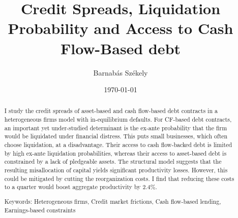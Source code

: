 \documentclass[12pt]{article}
\title{Credit Spreads, Liquidation Probability and Access to Cash Flow-Based debt}
\date{}
\begin{document}
\author{Barnabás Székely}
\date{\today}
\vspace{-1in}

\maketitle

\begin{abstract}
\noindent

I study the credit spreads of asset-based and cash flow-based debt contracts in a heterogeneous firms model with in-equilibrium defaults. For CF-based debt contracts, an important yet under-studied determinant is the ex-ante probability that the firm would be liquidated under financial distress. This puts small businesses, which often choose liquidation, at a disadvantage. Their access to cash flow-backed debt is limited by high ex-ante liquidation probabilities, whereas their access to asset-based debt is constrained by a lack of pledgeable assets. The structural model suggests that the resulting misallocation of capital yields significant productivity losses. However, this could be mitigated by cutting the reorganization costs. I find that reducing these costs to a quarter would boost aggregate productivity by 2.4\%. 

\bigskip{}
\bigskip{}

Keywords: Heterogeneous firms, Credit market frictions, Cash flow-based lending, Earnings-based constraints

\medskip{}
\end{abstract}
\thispagestyle{empty}

\pagebreak{}
\end{document}
